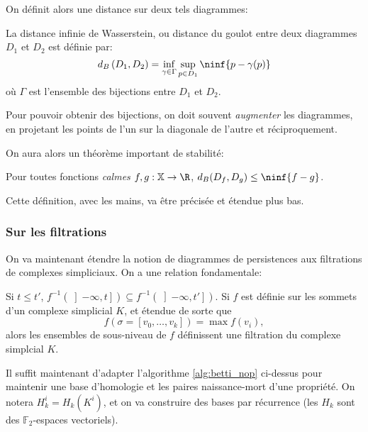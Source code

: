 On définit alors une distance sur deux tels diagrammes:
\begin{definition}
	La distance infinie de Wasserstein, ou distance du goulot entre deux diagrammes $D_{1}$ et $D_{2}$ est définie par:
	\begin{equation*}
		d_{B}\left(D_{1}, D_{2}\right) = \inf_{\gamma \in \Gamma}\sup_{p \in D_{1}} \ninf{p - \gamma(p)}
	\end{equation*}
	où $\Gamma$ est l'ensemble des bijections entre $D_{1}$ et $D_{2}$.
\end{definition}
\begin{remarque}
	Pour pouvoir obtenir des bijections, on doit souvent \emph{augmenter} les diagrammes, en projetant les points de l'un sur la diagonale de l'autre et réciproquement.
\end{remarque}

On aura alors un théorème important de stabilité:
\begin{thm}
	Pour toutes fonctions \emph{calmes} $f, g: \mathbb{X}\to \R$, $d_{B}(D_{f}, D_{g}) \leq \ninf{f - g}$.
\end{thm}

Cette définition, avec les mains, va être précisée et étendue plus bas.

\subsubsection{Sur les filtrations}
On va maintenant étendre la notion de diagrammes de persistences aux filtrations de complexes simpliciaux.
On a une relation fondamentale:
\begin{proposition}
	Si $t \leq t'$, $f^{-1}\left(\left]-\infty, t\right]\right) \subseteq f^{-1}\left(\left]-\infty, t'\right]\right)$.
	Si $f$ est définie sur les sommets d'un complexe simplicial $K$, et étendue de sorte que
	\begin{equation*}
		f\left(\sigma = \left[v_{0}, \ldots, v_{k}\right]\right) = \max f\left(v_{i}\right),
	\end{equation*}
	alors les ensembles de sous-niveau de $f$ définissent une filtration du complexe simplcial $K$.
\end{proposition}

Il suffit maintenant d'adapter l'algorithme \ref{alg:betti_nop} ci-dessus pour maintenir une base d'homologie et les paires naissance-mort d'une propriété.
On notera $H_{k}^{i} = H_{k}\left(K^{i}\right)$, et on va construire des bases par récurrence (les $H_{k}$ sont des $\mathbb{F}_{2}$-espaces vectoriels).

